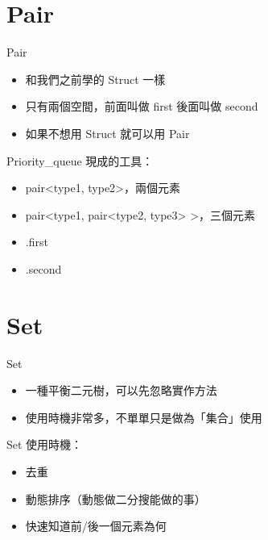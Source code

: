\documentclass[mathserif]{beamer}
\begin{document}
\section{Pair}

\begin{frame}{Pair}
    \begin{itemize}
        \item 和我們之前學的 Struct 一樣
        \item 只有兩個空間，前面叫做 first 後面叫做 second
        \item 如果不想用 Struct 就可以用 Pair
    \end{itemize}
\end{frame}

\begin{frame}{Priority\_queue}
    現成的工具：
    \begin{itemize}
        \item pair<{\color{red}type1}, {\color{red}type2}>，兩個元素
        \item pair<{\color{red}type1}, pair<{\color{red}type2}, {\color{red}type3}> >，三個元素
        \item .first
        \item .second
    \end{itemize}
\end{frame}

\section{Set}

\begin{frame}{Set}
    \begin{itemize}
        \item 一種平衡二元樹，可以先忽略實作方法
        \item 使用時機非常多，不單單只是做為「集合」使用
    \end{itemize}
\end{frame}

\begin{frame}{Set}
    使用時機：
    \begin{itemize}
        \item 去重
        \item 動態排序（動態做二分搜能做的事）
        \item 快速知道前/後一個元素為何
    \end{itemize}
\end{frame}
\end{document}
